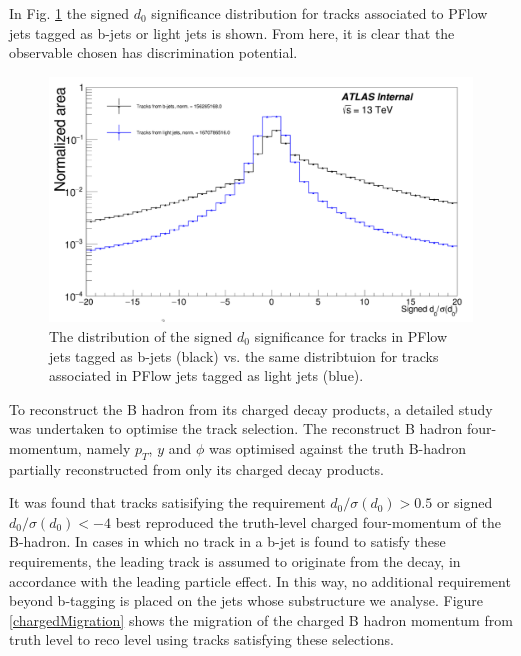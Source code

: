 \documentclass[10pt,a4paper]{book}
\begin{document}
In Fig. \ref{pflowD0} the signed $d_0$ significance distribution for tracks associated to PFlow jets tagged as b-jets or light jets is shown. From here, it is clear that the observable chosen has discrimination potential.

\begin{figure}
    \centering
    \includegraphics[width=\linewidth]{pflowD0}
    \caption{The distribution of the signed $d_0$ significance for tracks in PFlow jets tagged as b-jets (black) vs. the same distribtuion for tracks associated in PFlow jets tagged as light jets (blue).}
    \label{pflowD0}
\end{figure}

To reconstruct the B hadron from its charged decay products, a detailed study was undertaken to optimise the track selection. The reconstruct B hadron four-momentum, namely $p_T$, $y$ and $\phi$ was optimised against the truth B-hadron partially reconstructed from only its charged decay products. 

It was found that tracks satisifying the requirement $d_0/\sigma(d_0) > 0.5$ or signed $d_0/\sigma(d_0) < -4$ best reproduced the truth-level charged four-momentum of the B-hadron. In cases in which no track in a b-jet is found to satisfy these requirements, the leading track is assumed to originate from the decay, in accordance with the leading particle effect. In this way, no additional requirement beyond b-tagging is placed on the jets whose substructure we analyse. Figure \ref{chargedMigration} shows the migration of the charged B hadron momentum from truth level to reco level using tracks satisfying these selections.
\end{document}
